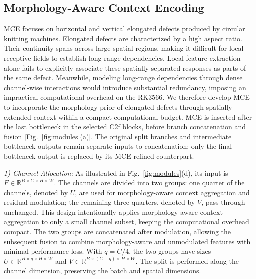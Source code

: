 \documentclass[journal]{IEEEtranTIE}
\begin{document}
\subsection{Morphology-Aware Context Encoding}
MCE focuses on horizontal and vertical elongated defects produced by circular knitting machines. Elongated defects are characterized by a high aspect ratio. Their continuity spans across large spatial regions, making it difficult for local receptive fields to establish long-range dependencies. Local feature extraction alone fails to explicitly associate these spatially separated responses as parts of the same defect. Meanwhile, modeling long-range dependencies through dense channel-wise interactions would introduce substantial redundancy, imposing an impractical computational overhead on the RK3566. We therefore develop MCE to incorporate the morphology prior of elongated defects through spatially extended context within a compact computational budget. MCE is inserted after the last bottleneck in the selected C2f blocks, before branch concatenation and fusion [Fig.~\ref{fig:modules}(a)]. The original split branches and intermediate bottleneck outputs remain separate inputs to concatenation; only the final bottleneck output is replaced by its MCE-refined counterpart.

\emph{1) Channel Allocation:}
 As illustrated in Fig.~\ref{fig:modules}(d), its input is $F\in\mathbb{R}^{B\times C\times H\times W}$. The channels are divided into two groups: one quarter of the channels, denoted by $U$, are used for morphology-aware context aggregation and residual modulation; the remaining three quarters, denoted by $V$, pass through unchanged. This design intentionally applies morphology-aware context aggregation to only a small channel subset, keeping the computational overhead compact. The two groups are concatenated after modulation, allowing the subsequent fusion to combine morphology-aware and unmodulated features with minimal performance loss. With $q=C/4$, the two groups have sizes $U\in\mathbb{R}^{B\times q\times H\times W}$ and $V\in\mathbb{R}^{B\times(C-q)\times H\times W}$. The split is performed along the channel dimension, preserving the batch and spatial dimensions.
\end{document}
